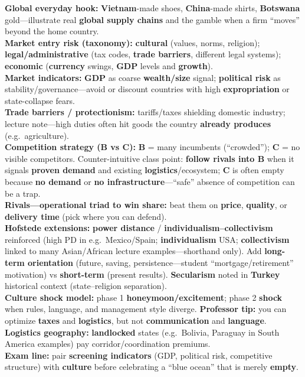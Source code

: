 \documentclass[10pt,a4paper]{article}
\begin{document}
{
\textbf{Global everyday hook:} \textbf{Vietnam}-made shoes, \textbf{China}-made shirts, \textbf{Botswana} gold---illustrate real \textbf{global supply chains} and the gamble when a firm ``moves'' beyond the home country.\\
\textbf{Market entry risk (taxonomy):} \textbf{cultural} (values, norms, religion); \textbf{legal/administrative} (tax codes, \textbf{trade barriers}, different legal systems); \textbf{economic} (\textbf{currency} swings, \textbf{GDP} levels and \textbf{growth}).\\
\textbf{Market indicators:} \textbf{GDP} as coarse \textbf{wealth/size} signal; \textbf{political risk} as stability/governance---avoid or discount countries with high \textbf{expropriation} or state-collapse fears.\\
\textbf{Trade barriers / protectionism:} tariffs/taxes shielding domestic industry; lecture note---high duties often hit goods the country \textbf{already produces} (e.g.\ agriculture).\\
\textbf{Competition strategy (B vs C):} \textbf{B} = many incumbents (``crowded''); \textbf{C} = no visible competitors. Counter-intuitive class point: \textbf{follow rivals into B} when it signals \textbf{proven demand} and existing \textbf{logistics}/ecosystem; \textbf{C} is often empty because \textbf{no demand} or \textbf{no infrastructure}---``safe'' absence of competition can be a trap.\\
\textbf{Rivals---operational triad to win share:} beat them on \textbf{price}, \textbf{quality}, or \textbf{delivery time} (pick where you can defend).\\
\textbf{Hofstede extensions:} \textbf{power distance} / \textbf{individualism--collectivism} reinforced (high PD in e.g.\ Mexico/Spain; \textbf{individualism} USA; \textbf{collectivism} linked to many Asian/African lecture examples---shorthand only). Add \textbf{long-term orientation} (future, saving, persistence---student ``mortgage/retirement'' motivation) vs \textbf{short-term} (present results). \textbf{Secularism} noted in \textbf{Turkey} historical context (state--religion separation).\\
\textbf{Culture shock model:} phase 1 \textbf{honeymoon/excitement}; phase 2 \textbf{shock} when rules, language, and management style diverge. \textbf{Professor tip:} you can optimize \textbf{taxes} and \textbf{logistics}, but not \textbf{communication} and \textbf{language}.\\
\textbf{Logistics geography:} \textbf{landlocked} states (e.g.\ Bolivia, Paraguay in South America examples) pay corridor/coordination premiums.\\
\textbf{Exam line:} pair \textbf{screening indicators} (GDP, political risk, competitive structure) with \textbf{culture} before celebrating a ``blue ocean'' that is merely \textbf{empty}.
}
\end{document}
